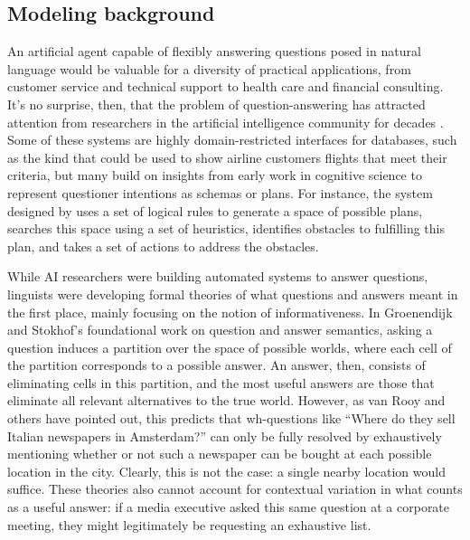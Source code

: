 \documentclass[12pt, floatsintext, jou]{apa6}
\begin{document}
\subsection{Modeling background}

An artificial agent capable of flexibly answering questions posed in natural language would be valuable for a diversity of practical applications, from customer service and technical support to health care and financial consulting. It's no surprise, then, that the problem of question-answering has attracted attention from researchers in the artificial intelligence community for decades \cite{Simmons65_QuestionsComputer, Lehnert77_QuestionAnswering, AllenPerrault80_IntentionUtterances, GreenCarberry94_IndirectAnswersModel, MollaVicedo07_QARestrictedDomains}. Some of these systems are highly domain-restricted interfaces for databases, such as the kind that could be used to show airline customers flights that meet their criteria, but many build on insights from early work in cognitive science to represent questioner intentions as schemas or plans. For instance, the system designed by  uses a set of logical rules to generate a space of possible plans, searches this space using a set of heuristics, identifies obstacles to fulfilling this plan, and takes a set of actions to address the obstacles. 

While AI researchers were building automated systems to answer questions, linguists were developing formal theories of what questions and answers meant in the first place, mainly focusing on the notion of informativeness. In Groenendijk and Stokhof's \citeyear{GroenendijkStokhof84_SemanticsOfQuestions} foundational work on question and answer semantics, asking a question induces a partition over the space of possible worlds, where each cell of the partition corresponds to a possible answer. An answer, then, consists of eliminating cells in this partition, and the most useful answers are those that eliminate all relevant alternatives to the true world. However, as van Rooy \citeyear{VanRooy03_QuestioningDecisionProblems} and others \cite{Ginzburg95_ResolvingQuestions} have pointed out, this predicts that wh-questions like ``Where do they sell Italian newspapers in Amsterdam?'' can only be fully resolved by exhaustively mentioning whether or not such a newspaper can be bought at each possible location in the city. Clearly, this is not the case: a single nearby location would suffice. These theories also cannot account for contextual variation in what counts as a useful answer: if a media executive asked this same question at a corporate meeting, they might legitimately be requesting an exhaustive list.
\end{document}
